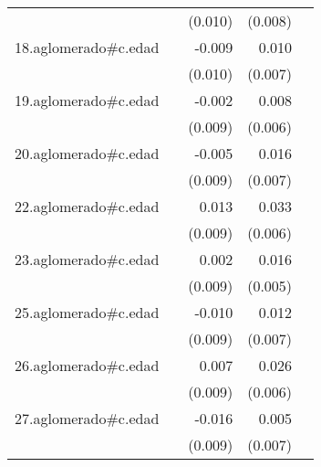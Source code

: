 {\begin{longtable}{l*{4}{D{.}{.}{-1}}}
            &                     &     (0.010)         &     (0.008)         &                     \\
\addlinespace
18.aglomerado#c.edad&                     &      -0.009         &       0.010         &                     \\
            &                     &     (0.010)         &     (0.007)         &                     \\
\addlinespace
19.aglomerado#c.edad&                     &      -0.002         &       0.008         &                     \\
            &                     &     (0.009)         &     (0.006)         &                     \\
\addlinespace
20.aglomerado#c.edad&                     &      -0.005         &       0.016\sym{*}  &                     \\
            &                     &     (0.009)         &     (0.007)         &                     \\
\addlinespace
22.aglomerado#c.edad&                     &       0.013         &       0.033\sym{***}&                     \\
            &                     &     (0.009)         &     (0.006)         &                     \\
\addlinespace
23.aglomerado#c.edad&                     &       0.002         &       0.016\sym{**} &                     \\
            &                     &     (0.009)         &     (0.005)         &                     \\
\addlinespace
25.aglomerado#c.edad&                     &      -0.010         &       0.012         &                     \\
            &                     &     (0.009)         &     (0.007)         &                     \\
\addlinespace
26.aglomerado#c.edad&                     &       0.007         &       0.026\sym{***}&                     \\
            &                     &     (0.009)         &     (0.006)         &                     \\
\addlinespace
27.aglomerado#c.edad&                     &      -0.016         &       0.005         &                     \\
            &                     &     (0.009)         &     (0.007)         &                     \\

\end{longtable}}
